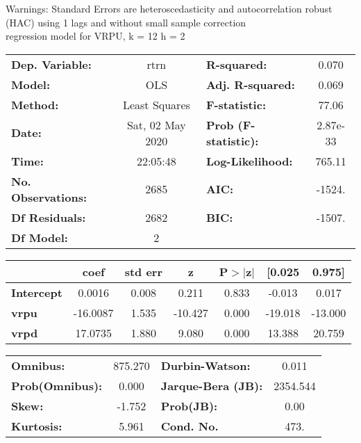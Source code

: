 Warnings: \newline
 [1] Standard Errors are heteroscedasticity and autocorrelation robust (HAC) using 1 lags and without small sample correction\\ 

regression model for VRPU, k = 12 h = 2\begin{center}
\begin{tabular}{lclc}
\toprule
\textbf{Dep. Variable:}    &       rtrn       & \textbf{  R-squared:         } &     0.070   \\
\textbf{Model:}            &       OLS        & \textbf{  Adj. R-squared:    } &     0.069   \\
\textbf{Method:}           &  Least Squares   & \textbf{  F-statistic:       } &     77.06   \\
\textbf{Date:}             & Sat, 02 May 2020 & \textbf{  Prob (F-statistic):} &  2.87e-33   \\
\textbf{Time:}             &     22:05:48     & \textbf{  Log-Likelihood:    } &    765.11   \\
\textbf{No. Observations:} &        2685      & \textbf{  AIC:               } &    -1524.   \\
\textbf{Df Residuals:}     &        2682      & \textbf{  BIC:               } &    -1507.   \\
\textbf{Df Model:}         &           2      & \textbf{                     } &             \\
\bottomrule
\end{tabular}
\begin{tabular}{lcccccc}
                   & \textbf{coef} & \textbf{std err} & \textbf{z} & \textbf{P$> |$z$|$} & \textbf{[0.025} & \textbf{0.975]}  \\
\midrule
\textbf{Intercept} &       0.0016  &        0.008     &     0.211  &         0.833        &       -0.013    &        0.017     \\
\textbf{vrpu}      &     -16.0087  &        1.535     &   -10.427  &         0.000        &      -19.018    &      -13.000     \\
\textbf{vrpd}      &      17.0735  &        1.880     &     9.080  &         0.000        &       13.388    &       20.759     \\
\bottomrule
\end{tabular}
\begin{tabular}{lclc}
\textbf{Omnibus:}       & 875.270 & \textbf{  Durbin-Watson:     } &    0.011  \\
\textbf{Prob(Omnibus):} &   0.000 & \textbf{  Jarque-Bera (JB):  } & 2354.544  \\
\textbf{Skew:}          &  -1.752 & \textbf{  Prob(JB):          } &     0.00  \\
\textbf{Kurtosis:}      &   5.961 & \textbf{  Cond. No.          } &     473.  \\
\bottomrule
\end{tabular}
\end{center}

